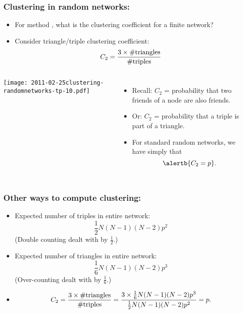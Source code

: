 \begin{frame}
  \frametitle{Clustering in random networks:}
  
  \begin{itemize}
    \item<1-> 
      For method , 
      what is the clustering coefficient for a finite network?
    \item<2->
      Consider triangle/triple clustering coefficient:\cite{newman2003a}
      $$ C_2 = \frac{3 \times \textnormal{\#triangles}}{\textnormal{\#triples}} $$ 
  \end{itemize}
  \begin{overprint}
  \begin{columns}
    \texttt{[image: 2011-02-25clustering-randomnetworks-tp-10.pdf]}
    \begin{itemize}
    \item<3-> 
      Recall:
      $C_2$ = probability that two friends
      of a node are also friends. 
    \item<4-> 
      Or: $C_2$ = probability that a triple is part of a triangle.
    \item<5-> 
      For standard random networks, we have simply
      that 
      $$\alertb{C_2 = p}.$$
    \end{itemize}
  \end{columns}
  \end{overprint}
  
\end{frame}

\begin{frame}
  \frametitle{Other ways to compute clustering:}

  \begin{itemize}
  \item<1-> 
    Expected number of triples in entire network:
    $$
    \frac{1}{2}N(N-1)(N-2)p^2
    $$
    (Double counting dealt with by $\frac{1}{2}$.)
  \item<2-> 
    Expected number of triangles in entire network:
    $$
    \frac{1}{6}N(N-1)(N-2)p^3
    $$
    (Over-counting dealt with by $\frac{1}{6}$.)
  \item<3->
    $$ 
    C_2 = \frac{3 \times \textnormal{\#triangles}}{\textnormal{\#triples}} 
    = 
    \frac{
      3 \times \frac{1}{6}N(N-1)(N-2)p^3
    }
    {
      \frac{1}{2}N(N-1)(N-2)p^2
    }
    = p.
    $$
  \end{itemize}

\end{frame}

